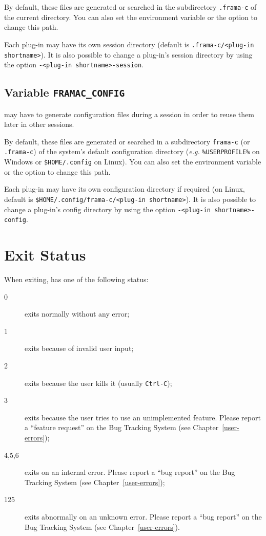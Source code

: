 By default, these files are generated or searched in the subdirectory
\texttt{.frama-c} of the current directory. You can also set the environment
variable  or the option  to
change this path.

Each \FramaC plug-in may have its own session directory (default is
\texttt{.frama-c/<plug-in shortname>}). It is also possible to change
a plug-in's session directory by using the option \texttt{-<plug-in
  shortname>-session}.

\subsection{Variable \texttt{FRAMAC\_CONFIG}}\label{sec:var-config}

\FramaC may have to generate configuration files during a session in order to
reuse them later in other sessions.

By default, these files are generated or searched in a subdirectory
\texttt{frama-c} (or \texttt{.frama-c}) of the system's default configuration
directory ({\it e.g.}
\texttt{\%USERPROFILE\%} on Windows or \texttt{\$HOME/.config}
on Linux). You can also set the environment variable 
or the option  to change this path.

Each \FramaC plug-in may have its own configuration directory if required (on
Linux, default is \texttt{\$HOME/.config/frama-c/<plug-in shortname>}). It is
also possible to change a plug-in's config directory by using the option
\texttt{-<plug-in shortname>-config}.

\section{Exit Status}

When exiting, \FramaC has one of the following status:
\begin{description}
\item[0] \FramaC exits normally without any error;
\item[1] \FramaC exits because of invalid user input;
\item[2] \FramaC exits because the user kills it (usually \via \texttt{Ctrl-C});
\item[3] \FramaC exits because the user tries to use an unimplemented feature.
  Please report a ``feature request'' on the Bug Tracking System (see
  Chapter~\ref{user-errors});
\item[4,5,6] \FramaC exits on an internal error. Please report a ``bug report'' on
  the Bug Tracking System (see Chapter~\ref{user-errors});
\item[125] \FramaC exits abnormally on an unknown error. Please report a ``bug
  report'' on the Bug Tracking System (see Chapter~\ref{user-errors}).
\end{description}

